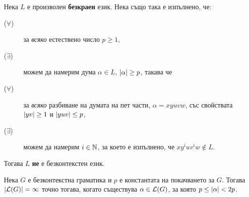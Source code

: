 \begin{cor}
  \label{cor:pumping-context-free}
  Нека $L$ е произволен {\bf безкраен} език. Нека също така е изпълнено, че:
  \begin{description}
  \item[($\forall$)]
    за {\em всяко} естествено число $p \geq 1$,
  \item[($\exists$)]
    можем да намерим дума $\alpha \in L$, $\vert{\alpha}\vert\geq p$, такава че
  \item[($\forall$)]
    за {\em всяко} разбиване на думата на пет части, $\alpha = xyuvw$, със свойствата $\vert{yv}\vert \geq 1$ и $\vert{yuv}\vert \leq p$,
  \item[($\exists$)]
    можем да намерим $i \in \mathbb{N}$, за което е изпълнено, че $xy^iuv^iw \not\in L$.
  \end{description}  
  Тогава $L$ {\bf не} е безконтекстен език.
\end{cor}

\begin{cor}
  Нека $G$ е безконтекстна граматика и $p$ е константата на покачването за $G$.
  Тогава $\vert{\mathcal{L}(G)}\vert = \infty$ точно тогава, когато съществува $\alpha \in \mathcal{L}(G)$, за която $p \leq \vert{\alpha}\vert < 2p$.
\end{cor}



